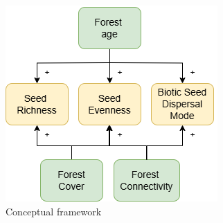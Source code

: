 
\begin{figure}[]
\begin{center}
		\includegraphics[]{Proposal/graphics/contextual_framework.drawio.png}
	\caption{Conceptual framework}
\label{fig:cf}
\end{center}
\end{figure}